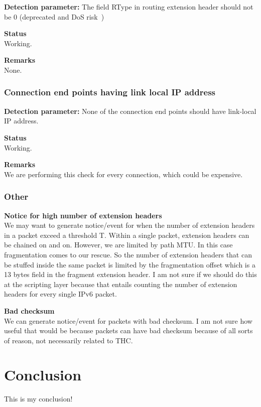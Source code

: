 \documentclass{article}
\begin{document}
\textbf{Detection parameter:}
The field RType in routing extension header should not be 0 
	(deprecated and DoS risk~\cite{rtype-deprecation})
	 
\textbf{Status}\\
Working.

\textbf{Remarks}\\
None.

\subsubsection{Connection end points having link local IP address}

\textbf{Detection parameter:}
None of the connection end points should have link-local IP address.
	 
\textbf{Status}\\
Working.

\textbf{Remarks}\\
We are performing this check for every connection, 
	which could be expensive.
	
	
\subsubsection{Other}

\textbf{Notice for high number of extension headers}\\
We may want to generate notice/event for when the number of extension headers
	in a packet exceed a threshold T.
Within a single packet, extension headers can be chained on and on.
However, we are limited by path MTU.
In this case fragmentation comes to our rescue.
So the number of extension headers that can be stuffed inside the same
	packet is limited by the fragmentation offset which is a 13 bytes field
	in the fragment extension header.
I am not sure if we should do this at the scripting layer because that
	entails counting the number of extension headers for every single IPv6 packet.		

\textbf{Bad checksum}\\
We can generate notice/event for packets with bad checksum.
I am not sure how useful that would be because packets can have bad checksum
	because of all sorts of reason, not necessarily related to THC.

\section{Conclusion}
This is my conclusion!
\end{document}
